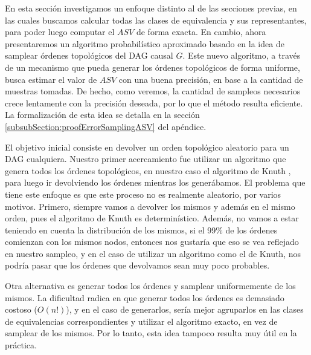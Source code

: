 En esta sección investigamos un enfoque distinto al de las secciones previas, en las cuales buscamos calcular todas las clases de equivalencia y sus representantes, para poder luego computar el $ASV$ de forma exacta. En cambio, ahora presentaremos un algoritmo probabilístico aproximado basado en la idea de samplear órdenes topológicos del DAG causal $G$.
Este nuevo algoritmo, a través de un mecanismo que pueda generar los órdenes topológicos de forma uniforme, busca estimar el valor de $ASV$ con una buena precisión, en base a la cantidad de muestras tomadas. De hecho, como veremos, la cantidad de sampleos necesarios crece lentamente con la precisión deseada, por lo que el método resulta eficiente. La formalización de esta idea se detalla en la sección \ref{subsubSection:proofErrorSamplingASV} del apéndice.


El objetivo inicial consiste en devolver un orden topológico aleatorio para un DAG cualquiera. Nuestro primer acercamiento fue utilizar un algoritmo que genera todos los órdenes topológicos, en nuestro caso el algoritmo de Knuth \cite{algorithmForAllTopoSorts}, para luego ir devolviendo los órdenes mientras los generábamos. El problema que tiene este enfoque es que este proceso no es realmente aleatorio, por varios motivos. Primero, siempre vamos a devolver los mismos y además en el mismo orden, pues el algoritmo de Knuth es determinístico. Además, no vamos a estar teniendo en cuenta la distribución de los mismos, si el 99\% de los órdenes comienzan con los mismos nodos, entonces nos gustaría que eso se vea reflejado en nuestro sampleo, y en el caso de utilizar un algoritmo como el de Knuth, nos podría pasar que los órdenes que devolvamos sean muy poco probables. 

Otra alternativa es generar todos los órdenes y samplear uniformemente de los mismos. La dificultad radica en que generar todos los órdenes es demasiado costoso ($O(n!)$), y en el caso de generarlos, sería mejor agruparlos en las clases de equivalencias correspondientes y utilizar el algoritmo exacto, en vez de samplear de los mismos. Por lo tanto, esta idea tampoco resulta muy útil en la práctica. 



